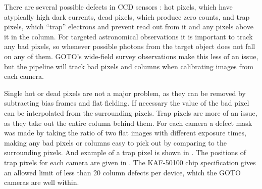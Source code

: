 \begin{colsection}
\begin{colsection}
There are several possible defects in CCD sensors \citep{CCDs}: hot pixels, which have atypically high dark currents, dead pixels, which produce zero counts, and trap pixels, which ``trap'' electrons and prevent read out from it and any pixels above it in the column. For targeted astronomical observations it is important to track any bad pixels, so whenever possible photons from the target object does not fall on any of them. GOTO's wide-field survey observations make this less of an issue, but the pipeline will track bad pixels and columns when calibrating images from each camera.

Single hot or dead pixels are not a major problem, as they can be removed by subtracting bias frames and flat fielding. If necessary the value of the bad pixel can be interpolated from the surrounding pixels. Trap pixels are more of an issue, as they take out the entire column behind them. For each camera a defect mask was made by taking the ratio of two flat images with different exposure times, making any bad pixels or columns easy to pick out by comparing to the surrounding pixels. And example of a trap pixel is shown in . The positions of trap pixels for each camera are given in . The KAF-50100 chip specification gives an allowed limit of less than 20 column defects per device, which the GOTO cameras are well within.


\end{colsection}
\end{colsection}
